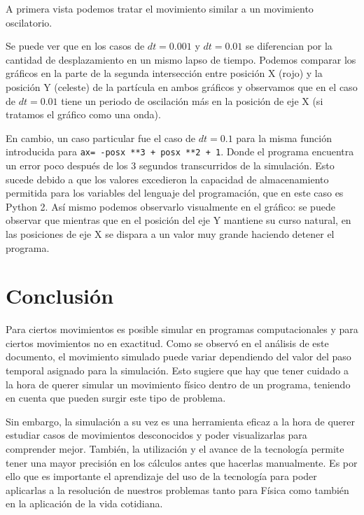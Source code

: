 \documentclass[12pt, a4paper]{article}
\begin{document}
A primera vista podemos tratar el movimiento similar a un movimiento oscilatorio. 


Se puede ver que en los casos de $dt=0.001$ y $dt=0.01$ se diferencian por la cantidad de desplazamiento en un mismo lapso de tiempo. Podemos comparar los gráficos en la parte de la segunda intersección entre posición X (rojo) y la posición Y (celeste) de la partícula en ambos gráficos y observamos que en el caso de $dt=0.01$ tiene un periodo de oscilación más en la posición de eje X (si tratamos el gráfico como una onda). 

En cambio, un caso particular fue el caso de $dt=0.1$ para la misma función introducida para \texttt{ax= -posx **3 + posx **2 + 1}. Donde el programa encuentra un error poco después de los 3 segundos transcurridos de la simulación. Esto sucede debido a que los valores excedieron la capacidad de almacenamiento permitida para los variables del lenguaje del programación, que en este caso es Python 2. Así mismo podemos observarlo visualmente en el gráfico: se puede observar que mientras que en el posición del eje Y mantiene su curso natural, en las posiciones de eje X se dispara a un valor muy grande haciendo detener el programa.

\section{Conclusión}
Para ciertos movimientos es posible simular en programas computacionales y para ciertos movimientos no en exactitud. Como se observó en el análisis de este documento, el movimiento simulado puede variar dependiendo del valor del paso temporal asignado para la simulación. Esto sugiere que hay que tener cuidado a la hora de querer simular un movimiento físico dentro de un programa, teniendo en cuenta que pueden surgir este tipo de problema.

Sin embargo, la simulación a su vez es una herramienta  eficaz a la hora de querer estudiar casos de movimientos desconocidos y poder visualizarlas para comprender mejor. También, la utilización y el avance de la tecnología  permite tener una mayor precisión en los cálculos antes que hacerlas manualmente. Es por ello que es importante el aprendizaje del uso de la tecnología para poder aplicarlas a la resolución de nuestros problemas tanto para Física como también en la aplicación de la vida cotidiana. 
\end{document}
